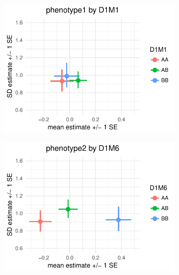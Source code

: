 \documentclass[9pt,twocolumn,twoside]{gsag3jnl}
\begin{document}
\begin{figure}[t]
    \begin{subfigure}[t]{0.5\linewidth}
        \includegraphics[width=\textwidth]{images/mean_var_plot_phen1.pdf}
    \end{subfigure}
    \hfill
    \begin{subfigure}[t]{0.5\linewidth}
        \includegraphics[width=\textwidth]{images/mean_var_plot_phen2.pdf}
    \end{subfigure}


\end{figure}
\end{document}
